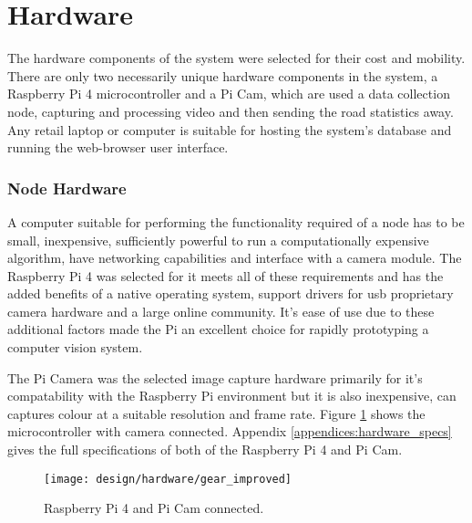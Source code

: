 \section{Hardware}

The hardware components of the system were selected for their cost and mobility. There are only two necessarily unique hardware components in the system, a Raspberry Pi 4 microcontroller and a Pi Cam, which are used a data collection node, capturing and processing video and then sending the road statistics away. Any retail laptop or computer is suitable for hosting the system's database and running the web-browser user interface.

\subsubsection{Node Hardware}

A computer suitable for performing the functionality required of a node has to be small, inexpensive, sufficiently powerful to run a computationally expensive algorithm, have networking capabilities and interface with a camera module. The Raspberry Pi 4 was selected for it meets all of these requirements and has the added benefits of a native operating system, support drivers for usb proprietary camera hardware and a large online community. It's ease of use due to these additional factors made the Pi an excellent choice for rapidly prototyping a computer vision system. 

The Pi Camera was the selected image capture hardware primarily for it's compatability with the Raspberry Pi environment but it is also inexpensive, can captures colour at a suitable resolution and frame rate. Figure \ref{fig:raspi_gear} shows the microcontroller with camera connected. Appendix \ref{appendices:hardware_specs} gives the full specifications of both of the Raspberry Pi 4 and Pi Cam.

\begin{figure}[H]
    \centering
    \centering\texttt{[image: design/hardware/gear\_improved]}
    \caption{Raspberry Pi 4 and Pi Cam connected.}
    \label{fig:raspi_gear}
  \end{figure}
  